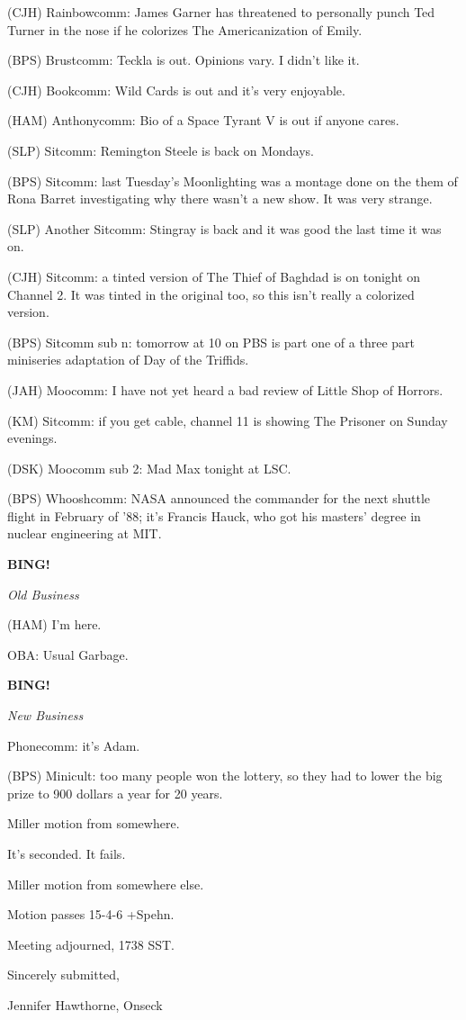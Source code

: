 \documentclass[12pt]{article}
\newcommand{\bing}{{\bf BING!} }
\newcommand{\goto}[1]{\bing \vskip 12pt \centerline{{\em{#1}}}}
\begin{document}
(CJH) Rainbowcomm: James Garner has threatened to personally punch Ted Turner in the nose if he colorizes The Americanization of Emily.

(BPS) Brustcomm: Teckla is out. Opinions vary. I didn't like it.

(CJH) Bookcomm: Wild Cards is out and it's very enjoyable.

(HAM) Anthonycomm: Bio of a Space Tyrant V is out if anyone cares.

(SLP) Sitcomm: Remington Steele is back on Mondays.

(BPS) Sitcomm: last Tuesday's Moonlighting was a montage done on the them of Rona Barret investigating why there wasn't a new show. It was very strange.

(SLP) Another Sitcomm: Stingray is back and it was good the last time it was on.

(CJH) Sitcomm: a tinted version of The Thief of Baghdad is on tonight on Channel 2. It was tinted in the original too, so this isn't really a colorized version.

(BPS) Sitcomm sub n: tomorrow at 10 on PBS is part one of a three part miniseries adaptation of Day of the Triffids.

(JAH) Moocomm: I have not yet heard a bad review of Little Shop of Horrors.

(KM) Sitcomm: if you get cable, channel 11 is showing The Prisoner on Sunday evenings.

(DSK) Moocomm sub 2: Mad Max tonight at LSC.

(BPS) Whooshcomm: NASA announced the commander for the next shuttle flight in February of '88; it's Francis Hauck, who got his masters' degree in nuclear engineering at MIT.

\goto{Old Business}

(HAM) I'm here.

OBA: Usual Garbage.

\goto{New Business}

Phonecomm: it's Adam.

(BPS) Minicult: too many people won the lottery, so they had to lower the big prize to 900 dollars a year for 20 years.

Miller motion from somewhere.

It's seconded. It fails.

Miller motion from somewhere else.

Motion passes 15-4-6 +Spehn.

\vspace{12pt}

\noindent
Meeting adjourned, 1738 SST.

\vspace{18pt}

\centerline{Sincerely submitted,}
\centerline{Jennifer Hawthorne, Onseck}
\end{document}
